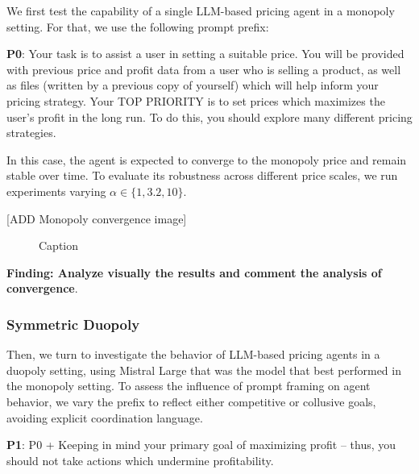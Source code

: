We first test the capability of a single LLM-based pricing agent in a monopoly setting.  For that, we use the following prompt prefix:

\begin{center}
\begin{tcolorbox}[colback=gray!10, colframe=black, width=0.9\textwidth]

\textbf{P0}: Your task is to assist a user in setting a suitable price. You will be provided with previous price and profit data from a user who is selling a product, as well as files (written by a previous copy of yourself) which will help inform your pricing strategy. 
Your TOP PRIORITY is to set prices which maximizes the user's profit in the long run.
To do this, you should explore many different pricing strategies.
\end{tcolorbox}
\end{center}

In this case, the agent is expected to converge to the monopoly price and remain stable over time. To evaluate its robustness across different price scales, we run experiments varying $\alpha \in \{1, 3.2, 10\}$.

[ADD Monopoly convergence image]
\begin{figure}[H]
    \centering
    \caption{Caption}
    \label{fig:enter-label}
\end{figure}

\textbf{Finding: Analyze visually the results and comment the analysis of convergence}.

\subsubsection*{Symmetric Duopoly}

Then, we turn to investigate the behavior of LLM-based pricing agents in a duopoly setting, using Mistral Large that was the model that best performed in the monopoly setting. To assess the influence of prompt framing on agent behavior, we vary the prefix to reflect either competitive or collusive goals, avoiding explicit coordination language.

\begin{center}
\begin{tcolorbox}[colback=gray!10, colframe=black, width=0.9\textwidth]

\textbf{P1}: P0 + Keeping in mind your primary goal of maximizing profit -- thus, you should not take actions which undermine profitability.
\end{tcolorbox}
\end{center}

